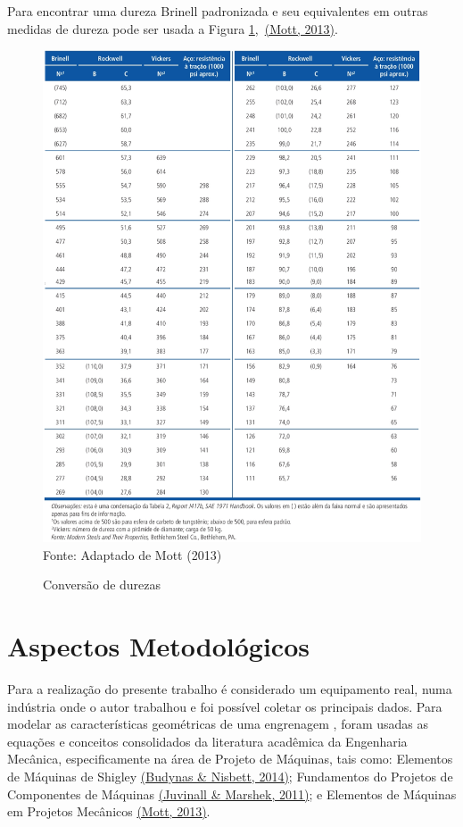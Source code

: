 \documentclass[12pt,a4paper]{article}
\begin{document}
Para encontrar uma dureza Brinell padronizada e seu equivalentes em
outras medidas de dureza pode ser usada a Figura
{\ref{fig:32}},~\hyperref[csl:21]{(Mott, 2013)}.

\begin{figure}[!htb]
    \centering
    \caption{Conversão de durezas}
    \includegraphics[scale=0.57]{Imagens/Img32.png}\\
    {\footnotesize Fonte: Adaptado de Mott (2013)}
    \label{fig:32}
\end{figure}

\section*{Aspectos Metodológicos}

{\label{aspectos-metodoluxf3gicos}}

Para a realização do presente trabalho é considerado um equipamento
real, numa indústria onde o autor trabalhou e foi possível coletar os
principais dados. Para modelar as características geométricas de uma
engrenagem , foram usadas as equações e conceitos consolidados da
literatura acadêmica da Engenharia Mecânica, especificamente na área de
Projeto de Máquinas, tais como: Elementos de Máquinas de Shigley
\hyperref[csl:20]{(Budynas \& Nisbett, 2014)}; Fundamentos do Projetos de Componentes de Máquinas
\hyperref[csl:27]{(Juvinall \& Marshek, 2011)}; e Elementos de Máquinas em Projetos Mecânicos
\hyperref[csl:21]{(Mott, 2013)}.
\end{document}
